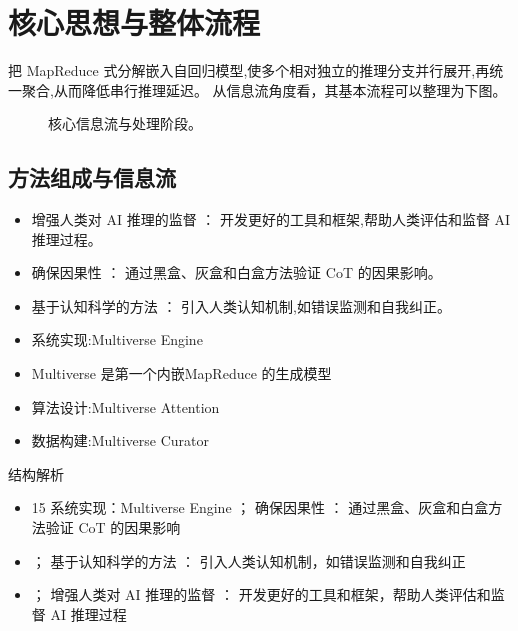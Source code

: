 \documentclass[UTF8,11pt,a4paper]{ctexart}
\begin{document}
\section{核心思想与整体流程}
把 MapReduce 式分解嵌入自回归模型,使多个相对独立的推理分支并行展开,再统一聚合,从而降低串行推理延迟。 从信息流角度看，其基本流程可以整理为下图。

\begin{figure}[H]
\centering
{}
\caption{核心信息流与处理阶段。}
\end{figure}

\subsection{方法组成与信息流}
\begin{itemize}
\item 增强人类对 AI 推理的监督 ： 开发更好的工具和框架,帮助人类评估和监督 AI 推理过程。
\item 确保因果性 ： 通过黑盒、灰盒和白盒方法验证 CoT 的因果影响。
\item 基于认知科学的方法 ： 引入人类认知机制,如错误监测和自我纠正。
\item 系统实现:Multiverse Engine
\item Multiverse 是第一个内嵌MapReduce 的生成模型
\item 算法设计:Multiverse Attention
\item 数据构建:Multiverse Curator
\end{itemize}

\begin{keybox}{结构解析}
\begin{itemize}
\item 15 系统实现：Multiverse Engine ； 确保因果性 ： 通过黑盒、灰盒和白盒方法验证 CoT 的因果影响
\item ； 基于认知科学的方法 ： 引入人类认知机制，如错误监测和自我纠正
\item ； 增强人类对 AI 推理的监督 ： 开发更好的工具和框架，帮助人类评估和监督 AI 推理过程
\end{itemize}
\end{keybox}
\end{document}
